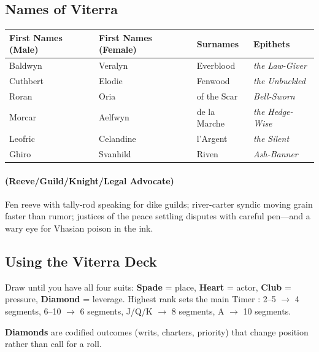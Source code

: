 \subsection{Names of Viterra}
\label{sec:viterra-names}

\begin{longtable}{|p{}|p{}|p{}|p{}|}
\hline
\textbf{First Names (Male)} & \textbf{First Names (Female)} & \textbf{Surnames} & \textbf{Epithets} \\
\hline
Baldwyn & Veralyn & Everblood & \textit{the Law-Giver} \\
\hline
Cuthbert & Elodie & Fenwood & \textit{the Unbuckled} \\
\hline
Roran & Oria & of the Scar & \textit{Bell-Sworn} \\
\hline
Morcar & Aelfwyn & de la Marche & \textit{the Hedge-Wise} \\
\hline
Leofric & Celandine & l'Argent & \textit{the Silent} \\
\hline
Ghiro & Svanhild & Riven & \textit{Ash-Banner} \\
\hline
\end{longtable}

\paragraph*{(Reeve/Guild/Knight/Legal Advocate)} Fen reeve with tally-rod speaking for dike guilds; river-carter syndic moving grain faster than rumor; justices of the peace settling disputes with careful pen---and a wary eye for Vhasian poison in the ink.

\subsection{Using the Viterra Deck}
\label{sec:viterra-deck}

Draw until you have all four suits: \textbf{Spade} = place, \textbf{Heart} = actor, \textbf{Club} = pressure, \textbf{Diamond} = leverage. Highest rank sets the main Timer : 2--5 $\rightarrow$ 4 segments, 6--10 $\rightarrow$ 6 segments, J/Q/K $\rightarrow$ 8 segments, A $\rightarrow$ 10 segments.

\textbf{Diamonds} are codified outcomes (writs, charters, priority) that change position rather than call for a roll.

